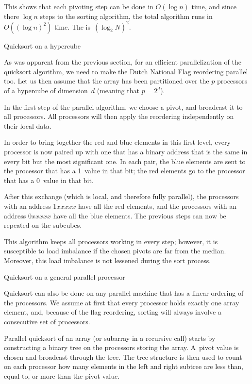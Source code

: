 This shows that each pivoting step can be done in $O(\log n)$ time,
and since there $\log n$ steps to the sorting algorithm, the
total algorithm runs in $O((\log n)^2)$ time.
%
The
%
is~$(\log_2N)^2$.


 {Quicksort on a hypercube}

As was apparent from the previous section, for an efficient
parallelization of the quicksort algorithm, we need to make the Dutch
National Flag reordering parallel too. Let us then assume that the
array has been partitioned over the $p$ processors of a hypercube of
dimension~$d$ (meaning that $p=2^d$).

In the first step of the parallel algorithm, we choose a pivot, and
broadcast it to all processors. All processors will then apply the
reordering independently on their local data. 

In order to bring together the red and blue elements in this first
level, every processor is now paired up with one that has a binary
address that is the same in every bit but the most significant one. In
each pair, the blue elements are sent to the processor that has a
1~value in that bit; the red elements go to the processor that has a
0~value in that bit.

After this exchange (which is local, and therefore fully parallel),
the processors with an address $1xxxxx$ have all the red elements, and
the processors with an address $0xxxxx$ have all the blue
elements. The previous steps can now be repeated on the subcubes.

This algorithm keeps all processors working in every step; however, it
is susceptible to load imbalance if the chosen pivots are far from the
median. Moreover, this load imbalance is not lessened during the sort
process.

 {Quicksort on a general parallel processor}

Quicksort can also be done on any parallel machine that has a linear
ordering of the processors. We assume at first that every processor
holds exactly one array element, and, because of the flag reordering,
sorting will always involve a consecutive set of processors.

Parallel quicksort of an array (or subarray in a recursive call)
starts by constructing a binary tree on the processors storing the
array. A~pivot value is chosen and broadcast through the tree. The
tree structure is then used to count on each processor how many
elements in the left and right subtree are less than, equal to, or
more than the pivot value. 

